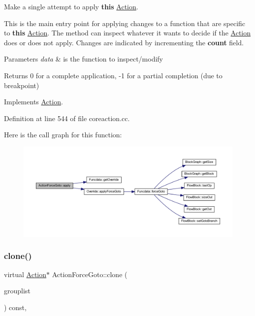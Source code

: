 Make a single attempt to apply {\bfseries{this}} \mbox{\hyperlink{class_action}{Action}}. 

This is the main entry point for applying changes to a function that are specific to {\bfseries{this}} \mbox{\hyperlink{class_action}{Action}}. The method can inspect whatever it wants to decide if the \mbox{\hyperlink{class_action}{Action}} does or does not apply. Changes are indicated by incrementing the {\bfseries{count}} field. 
\begin{DoxyParams}{Parameters}
{\em data} & is the function to inspect/modify \\
\hline
\end{DoxyParams}
\begin{DoxyReturn}{Returns}
0 for a complete application, -\/1 for a partial completion (due to breakpoint) 
\end{DoxyReturn}


Implements \mbox{\hyperlink{class_action_aac1c3999d6c685b15f5d9765a4d04173}{Action}}.



Definition at line 544 of file coreaction.\+cc.

Here is the call graph for this function\+:
\nopagebreak
\begin{figure}[H]
\begin{center}
\leavevmode
\includegraphics[width=350pt]{class_action_force_goto_af7842a93290323e3bb92dcd62c9a66cc_cgraph}
\end{center}
\end{figure}
\mbox{\label{class_action_force_goto_ab44cdae35f8c6fd4051b0ddb435fee9a}} 
\subsubsection{\texorpdfstring{clone()}{clone()}}
{\footnotesize\ttfamily virtual \mbox{\hyperlink{class_action}{Action}}$\ast$ Action\+Force\+Goto\+::clone (\begin{DoxyParamCaption}\item[{const \mbox{\hyperlink{class_action_group_list}{Action\+Group\+List}} \&}]{grouplist }\end{DoxyParamCaption}) const\hspace{0.3cm}{\ttfamily [inline]}, {\ttfamily [virtual]}}



